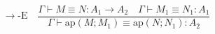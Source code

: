 \documentclass{article}
\begin{document}
\setlength\abovedisplayskip{0pt} %


\begin{preview}
\color[rgb]{0.000,0.000,0.004}\setcounter{equation}{0}%
\[\to\text{-E} \quad \frac{\Gamma \vdash M \equiv N : A_1 \rightarrow A_2 \quad \Gamma \vdash M_1 \equiv N_1 : A_1}{\Gamma \vdash \text{ap}(M; M_1) \equiv \text{ap}(N; N_1) : A_2} \]
\end{preview}
\end{document}
